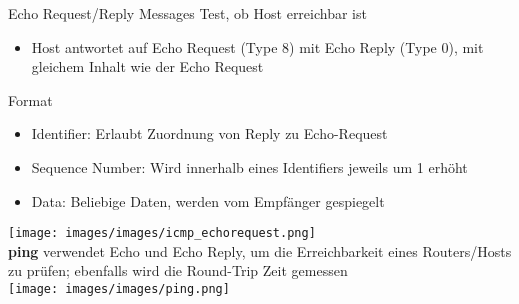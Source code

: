 \begin{definition}{Echo Request/Reply Messages}
    Test, ob Host erreichbar ist
    \begin{itemize}
        \item Host antwortet auf Echo Request (Type 8) mit Echo Reply (Type 0), mit gleichem Inhalt wie der Echo Request
    \end{itemize}
    Format
    \begin{itemize}
        \item Identifier: Erlaubt Zuordnung von Reply zu Echo-Request
        \item Sequence Number: Wird innerhalb eines Identifiers jeweils um 1 erhöht
        \item Data: Beliebige Daten, werden vom Empfänger gespiegelt
    \end{itemize}
        \texttt{[image: images/images/icmp\_echorequest.png]}\\
    \textbf{ping} verwendet Echo und Echo Reply, um die Erreichbarkeit eines Routers/Hosts zu prüfen; ebenfalls wird die Round-Trip Zeit gemessen\\
        \texttt{[image: images/images/ping.png]}
\end{definition}





